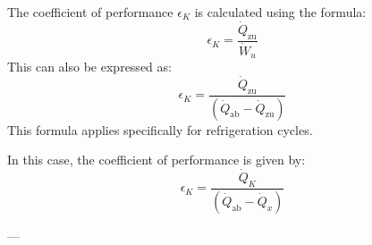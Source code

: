 The coefficient of performance \( \epsilon_K \) is calculated using the formula:  
\[
\epsilon_K = \frac{\dot{Q}_{\text{zu}}}{\dot{W}_u}
\]  
This can also be expressed as:  
\[
\epsilon_K = \frac{\dot{Q}_{\text{zu}}}{\left( \dot{Q}_{\text{ab}} - \dot{Q}_{\text{zu}} \right)}
\]  
This formula applies specifically for refrigeration cycles.  

In this case, the coefficient of performance is given by:  
\[
\epsilon_K = \frac{\dot{Q}_K}{\left( \dot{Q}_{\text{ab}} - \dot{Q}_x \right)}
\]  

---
